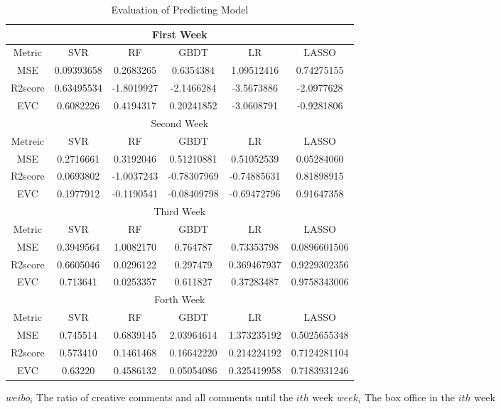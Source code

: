 \begin{table*}[!htbp]
\centering
\begin{tabular}{|c|c|c|c|c|c|}
\hline
\multicolumn{6}{|c|}{First Week}\\
\hline
Metric&SVR&RF&GBDT&LR&LASSO\\
\hline
MSE& 0.09393658& 0.2683265 & 0.6354384 & 1.09512416 & 0.74275155\\
\hline
R2score & 0.63495534&  -1.8019927	& -2.1466284&-3.5673886&-2.0977628\\
\hline
EVC&0.6082226&0.4194317&0.20241852&-3.0608791&-0.9281806\\
\hline
\multicolumn{6}{|c|}{Second Week}\\
\hline
Metreic & SVR&RF&GBDT&LR&LASSO\\
\hline
MSE&0.2716661&0.3192046&0.51210881&0.51052539&0.05284060\\
\hline
R2score&0.0693802&-1.0037243&-0.78307969&-0.74885631&0.81898915\\
\hline
EVC&0.1977912&-0.1190541&-0.08409798&-0.69472796&0.91647358\\
\hline
\multicolumn{6}{|c|}{Third Week}\\
\hline
Metric&SVR&RF&GBDT&LR&LASSO\\
\hline
MSE&0.3949564&1.0082170&0.764787&0.73353798&0.0896601506\\
\hline
R2score&0.6605046&0.0296122&0.297479&0.369467937&0.9229302356\\
\hline
EVC&0.713641&0.0253357&0.611827&0.37283487&0.9758343006\\
\hline
\multicolumn{6}{|c|}{Forth Week}\\
\hline
Metric&SVR&RF&GBDT&LR&LASSO\\
\hline
MSE&0.745514&0.6839145&2.03964614&1.373235192&0.5025655348\\
\hline
R2score&0.573410&0.1461468&0.16642220&0.214224192&0.7124281104\\
\hline
EVC&0.63220&0.4586132&0.05054086&0.325419958&0.7183931246\\
\hline
\end{tabular}
\caption{Evaluation of Predicting Model}
\end{table*}

$weibo_i$ The ratio of creative comments and all comments until the $ith$ week
$week_i$ The box office in the $ith$ week
